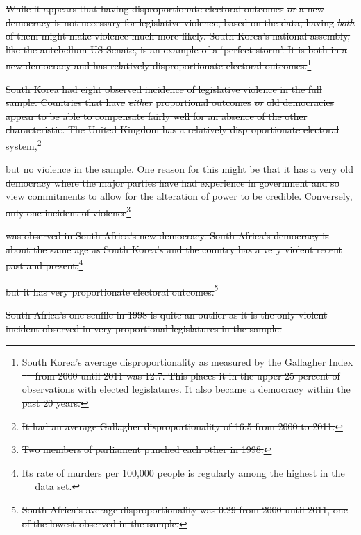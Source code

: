 \documentclass[a4paper]{article}\usepackage[]{graphicx}\usepackage[]{color}
\providecommand{\DIFdeltex}[1]{{\protect\color{red}\sout{#1}}}                      %
\providecommand{\DIFaddbegin}{} %
\providecommand{\DIFaddend}{} %
\providecommand{\DIFdelbegin}{} %
\providecommand{\DIFdelend}{} %
\providecommand{\DIFdel}[1]{\texorpdfstring{\DIFdeltex{#1}}{}} %
\begin{document}
\DIFdelbegin \DIFdel{While it appears that having disproportionate electoral outcomes }\emph{\DIFdel{or}} %
\DIFdel{a new democracy is not necessary for legislative violence, based on the data, having }\emph{\DIFdel{both}} %
\DIFdel{of them might make violence much more likely. South Korea's national assembly, like the antebellum US Senate, is an example of a `perfect storm'. It is both in a new democracy and has relatively disproportionate electoral outcomes.}\footnote{\DIFdel{South Korea's average disproportionality as measured by the Gallagher Index \mbox{%
\citep{Gallagher1991}
}%
from 2000 until 2011 was 12.7. This places it in the upper 25 percent of observations with elected legislatures. It also became a democracy within the past 20 years.}} %
\addtocounter{footnote}{-1}%
\DIFdel{South Korea had eight observed incidence of legislative violence in the full sample. Countries that have }\emph{\DIFdel{either}} %
\DIFdel{proportional outcomes }\emph{\DIFdel{or}} %
\DIFdel{old democracies appear to be able to compensate fairly well for an absence of the other characteristic. The United Kingdom has a relatively disproportionate electoral system,}\footnote{\DIFdel{It had an average Gallagher disproportionality of 16.5 from 2000 to 2011.}} %
\addtocounter{footnote}{-1}%
\DIFdel{but no violence in the sample. One reason for this might be that it has a very old democracy where the major parties have had experience in government and so view commitments to allow for the alteration of power to be credible. Conversely, only one incident of violence}\footnote{\DIFdel{Two members of parliament punched each other in 1998.}} %
\addtocounter{footnote}{-1}%
\DIFdel{was observed in South Africa's new democracy. South Africa's democracy is about the same age as South Korea's and the country has a very violent recent past and present,}\footnote{\DIFdel{Its rate of murders per 100,000 people is regularly among the highest in the \mbox{%
\cite{UNMurder2013}
}%
data set.}} %
\addtocounter{footnote}{-1}%
\DIFdel{but it has very proportionate electoral outcomes.}\footnote{\DIFdel{South Africa's average disproportionality was 0.29 from 2000 until 2011, one of the lowest observed in the sample.}} %
\addtocounter{footnote}{-1}%
\DIFdel{South Africa's one scuffle in 1998 is quite an outlier as it is the only violent incident observed in very proportional legislatures in the sample.
}\DIFdelend \DIFaddbegin \vspace{0.5cm}
\DIFaddend 
\end{document}
